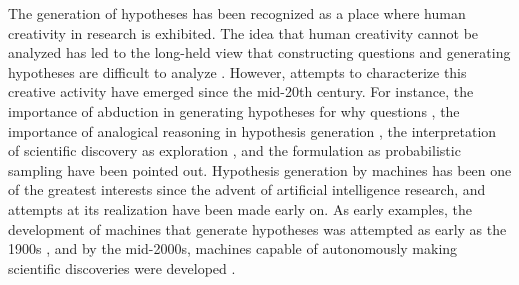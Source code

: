 The generation of hypotheses has been recognized as a place where human creativity in research is exhibited. The idea that human creativity cannot be analyzed has led to the long-held view that constructing questions and generating hypotheses are difficult to analyze \cite{sep-scientific-discovery}. However, attempts to characterize this creative activity have emerged since the mid-20th century. For instance, the importance of abduction in generating hypotheses for why questions \cite{hanson1965patterns,magnani2011abduction}, the importance of analogical reasoning in hypothesis generation \cite{hesse1965models,gentner2002analogy}, the interpretation of scientific discovery as exploration \cite{langley1987scientific}, and the formulation as probabilistic sampling \cite{dasgupta2017hypotheses} have been pointed out. Hypothesis generation by machines has been one of the greatest interests since the advent of artificial intelligence research, and attempts at its realization have been made early on. As early examples, the development of machines that generate hypotheses was attempted as early as the 1900s \cite{langley1987scientific,lindsay1993dendral}, and by the mid-2000s, machines capable of autonomously making scientific discoveries were developed \cite{king2004functional}. 



